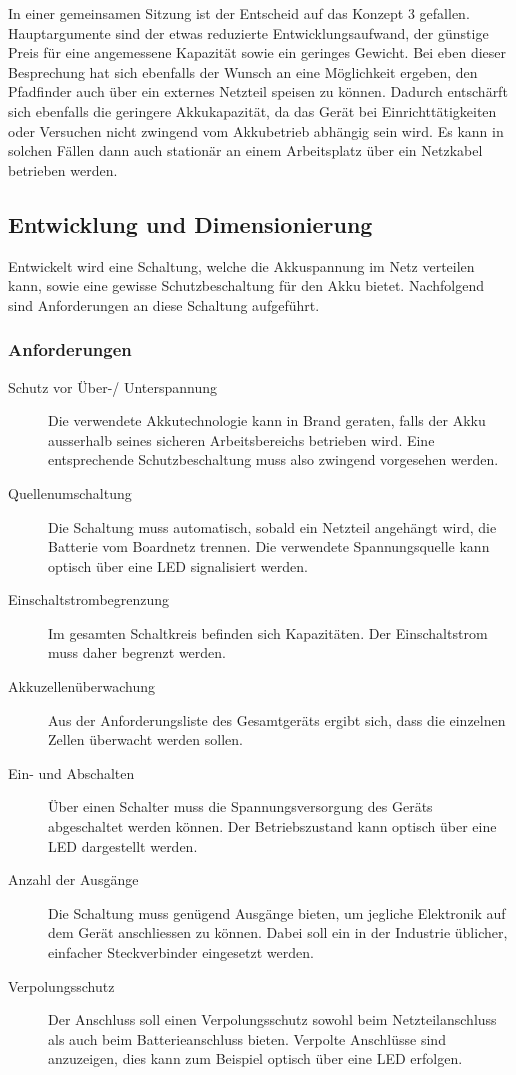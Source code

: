 \documentclass[main.tex]{subfiles} %
\begin{document}
In einer gemeinsamen Sitzung ist der Entscheid auf das Konzept 3 gefallen.
Hauptargumente sind der etwas reduzierte Entwicklungsaufwand, der günstige
Preis für eine angemessene Kapazität sowie ein geringes Gewicht. Bei eben
dieser Besprechung hat sich ebenfalls der Wunsch an eine Möglichkeit ergeben,
den Pfadfinder auch über ein externes Netzteil speisen zu können. Dadurch
entschärft sich ebenfalls die geringere Akkukapazität, da das Gerät bei
Einrichttätigkeiten oder Versuchen nicht zwingend vom Akkubetrieb abhängig sein
wird. Es kann in solchen Fällen dann auch stationär an einem Arbeitsplatz über
ein Netzkabel betrieben werden.

\subsection*{Entwicklung und Dimensionierung}

Entwickelt wird eine Schaltung, welche die Akkuspannung im Netz verteilen kann,
sowie eine gewisse Schutzbeschaltung für den Akku bietet. Nachfolgend sind
Anforderungen an diese Schaltung aufgeführt.

\subsubsection*{Anforderungen}
\begin{description}
    \item[Schutz vor Über-/ Unterspannung] Die verwendete Akkutechnologie kann in Brand
          geraten, falls der Akku ausserhalb seines sicheren Arbeitsbereichs betrieben
          wird. Eine entsprechende Schutzbeschaltung muss also zwingend vorgesehen
          werden.
    \item[Quellenumschaltung] Die Schaltung muss automatisch, sobald ein Netzteil
          angehängt wird, die Batterie vom Boardnetz trennen. Die verwendete
          Spannungsquelle kann optisch über eine LED signalisiert werden.
    \item[Einschaltstrombegrenzung] Im gesamten Schaltkreis befinden sich Kapazitäten.
          Der Einschaltstrom muss daher begrenzt werden.
    \item[Akkuzellenüberwachung] Aus der Anforderungsliste des Gesamtgeräts ergibt sich,
          dass die einzelnen Zellen überwacht werden sollen.
    \item[Ein- und Abschalten] Über einen Schalter muss die Spannungsversorgung des
          Geräts abgeschaltet werden können. Der Betriebszustand kann optisch über eine
          LED dargestellt werden.
    \item[Anzahl der Ausgänge] Die Schaltung muss genügend Ausgänge bieten, um jegliche
          Elektronik auf dem Gerät anschliessen zu können. Dabei soll ein in der
          Industrie üblicher, einfacher Steckverbinder eingesetzt werden.
    \item[Verpolungsschutz] Der Anschluss soll einen Verpolungsschutz sowohl beim
          Netzteilanschluss als auch beim Batterieanschluss bieten. Verpolte Anschlüsse
          sind anzuzeigen, dies kann zum Beispiel optisch über eine LED erfolgen.
\end{description}
\end{document}
